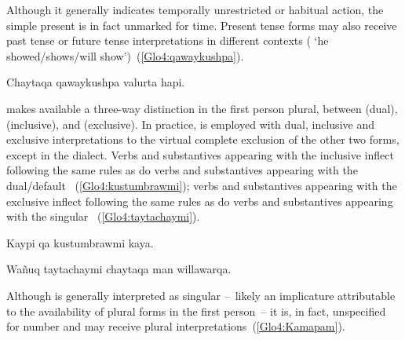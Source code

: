 \noindent
Although it generally indicates temporally unrestricted or habitual action, the simple present is in fact unmarked for time. Present tense forms may also receive past tense or future tense interpretations in different contexts ( ‘he showed/shows/will show’)~(\ref{Glo4:qawaykushpa}).

%
{Chaytaqa qawaykushpa valurta hapi.}%
{}%
{}{}%

\noindent
\SYQ{} makes available a three-way distinction in the first person plural, between  (dual),  (inclusive), and  (exclusive). In practice,  is employed with dual, inclusive and exclusive interpretations to the virtual complete exclusion of the other two forms, except in the \CH{} dialect. Verbs and substantives appearing with the inclusive  inflect following the same rules as do verbs and substantives appearing with the dual/default ~(\ref{Glo4:kustumbrawmi}); verbs and substantives appearing with the exclusive  inflect following the same rules as do verbs and substantives appearing with the singular ~(\ref{Glo4:taytachaymi}).

%
{Kaypi qa kustumbrawmi kaya.}%
{}%
{}{}%

%
{Wañuq taytachaymi chaytaqa man willawarqa.}%
{}%
{}{}%

\noindent
Although  is generally interpreted as singular --~likely an implicature attributable to the availability of plural forms in the first person~-- it is, in fact, unspecified for number and may receive plural interpretations~(\ref{Glo4:Kamapam}).

